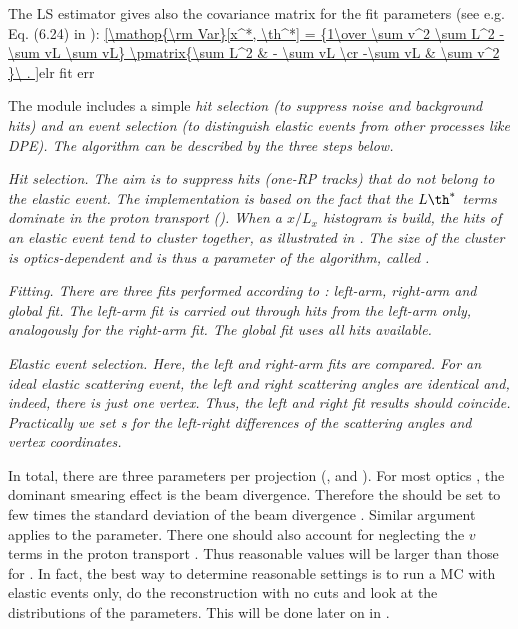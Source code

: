 The LS estimator gives also the covariance matrix for the fit parameters (see e.g. Eq. (6.24) in ):
\eqref{\mathop{\rm Var}[x^*, \th^*] = {1\over \sum v^2 \sum L^2 - \sum vL \sum vL} \pmatrix{\sum L^2 & - \sum vL \cr -\sum vL & \sum v^2 }\ .
}{elr fit err}

The module includes a simple \em{hit selection} (to suppress noise and background hits) and an \em{event selection} (to distinguish elastic events from other processes like DPE). The algorithm can be described by the three steps below.

\bitm
\itm \em{Hit selection}. The aim is to suppress hits (one-RP tracks) that do not belong to the elastic event. The implementation is based on the fact that the $L\th^*$ terms dominate in the proton transport  (). When a $x/L_x$ histogram is build, the hits of an elastic event tend to cluster together, as illustrated in . The size of the cluster is optics-dependent and is thus a parameter of the algorithm, called .


\itm \em{Fitting}. There are three fits performed according to : left-arm, right-arm and global fit. The left-arm fit is carried out through hits from the left-arm only, analogously for the right-arm fit. The global fit uses all hits available.

\itm \em{Elastic event selection}. Here, the left and right-arm fits are compared. For an ideal elastic scattering event, the left and right scattering angles are identical and, indeed, there is just one vertex. Thus, the left and right fit results should coincide. Practically we set s for the left-right differences of the scattering angles and vertex coordinates.
\eitm

In total, there are three parameters per projection (,  and ). For most optics , the dominant smearing effect is the beam divergence. Therefore the  should be set to few times the standard deviation of the beam divergence . Similar argument applies to the  parameter. There one should also account for neglecting the $v$ terms in the proton transport . Thus reasonable values will be larger than those for . In fact, the best way to determine reasonable settings is to run a MC with elastic events only, do the reconstruction with no cuts and look at the distributions of the parameters. This will be done later on in .

